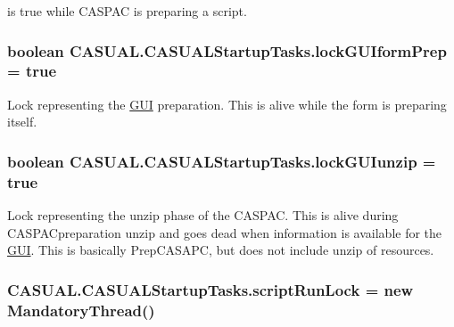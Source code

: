 is true while C\-A\-S\-P\-A\-C is preparing a script. \hypertarget{class_c_a_s_u_a_l_1_1_c_a_s_u_a_l_startup_tasks_a2aa519438e5c5454a6aeac1927706b86}{
\subsubsection[{lock\-G\-U\-Iform\-Prep}]{\setlength{\rightskip}{0pt plus 5cm}boolean C\-A\-S\-U\-A\-L.\-C\-A\-S\-U\-A\-L\-Startup\-Tasks.\-lock\-G\-U\-Iform\-Prep = true\hspace{0.3cm}{\ttfamily [static]}}}\label{class_c_a_s_u_a_l_1_1_c_a_s_u_a_l_startup_tasks_a2aa519438e5c5454a6aeac1927706b86}
Lock representing the \hyperlink{namespace_c_a_s_u_a_l_1_1_g_u_i}{G\-U\-I} preparation. This is alive while the form is preparing itself. \hypertarget{class_c_a_s_u_a_l_1_1_c_a_s_u_a_l_startup_tasks_a3116aebd500dbd313bb939a9ce4f81ab}{
\subsubsection[{lock\-G\-U\-Iunzip}]{\setlength{\rightskip}{0pt plus 5cm}boolean C\-A\-S\-U\-A\-L.\-C\-A\-S\-U\-A\-L\-Startup\-Tasks.\-lock\-G\-U\-Iunzip = true\hspace{0.3cm}{\ttfamily [static]}}}\label{class_c_a_s_u_a_l_1_1_c_a_s_u_a_l_startup_tasks_a3116aebd500dbd313bb939a9ce4f81ab}
Lock representing the unzip phase of the C\-A\-S\-P\-A\-C. This is alive during C\-A\-S\-P\-A\-Cpreparation unzip and goes dead when information is available for the \hyperlink{namespace_c_a_s_u_a_l_1_1_g_u_i}{G\-U\-I}. This is basically Prep\-C\-A\-S\-A\-P\-C, but does not include unzip of resources. \hypertarget{class_c_a_s_u_a_l_1_1_c_a_s_u_a_l_startup_tasks_ab857475aab8f73d290e1712c22b4f373}{
\subsubsection[{script\-Run\-Lock}]{ C\-A\-S\-U\-A\-L.\-C\-A\-S\-U\-A\-L\-Startup\-Tasks.\-script\-Run\-Lock = new {\bf Mandatory\-Thread}()\hspace{0.3cm}{\ttfamily [static]}}}\label{class_c_a_s_u_a_l_1_1_c_a_s_u_a_l_startup_tasks_ab857475aab8f73d290e1712c22b4f373}
